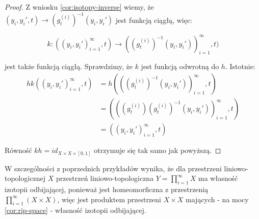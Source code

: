 \begin{ex}
\begin{proof}
    Z wniosku \ref{cor:isotopy-inverse} wiemy, że $(y_i, y_i', t) \rightarrow (g_t^{(i)})^{-1}(y_i, y_i')$ jest funkcją ciągłą, więc:
    
    \[
      k: ((y_i, y_i')_{i=1}^\infty, t) \rightarrow ((g_t^{(i)})^{-1}(y_i, y_i'))_{i=1}^\infty, t)
    \]
    
    jest także funkcją ciągłą. Sprawdzimy, że $k$ jest funkcją odwrotną do $h$. Istotnie:
    \begin{align*}
      hk((y_i, y_i')_{i=1}^\infty, t) &= h(((g_t^{(i)})^{-1}(y_i, y_i'))_{i=1}^\infty, t) \\
      &= (((g_t^{(i)})(g_t^{(i)})^{-1}(y_i, y_i'))_{i=1}^\infty, t) \\
      &= ((y_i, y_i')_{i=1}^\infty, t)
    \end{align*}
    
    Równość $kh = id_{X \times X \times [0,1]}$ otrzymuje się tak samo jak powyższą.

  \end{proof}
\end{ex}

\begin{ex}
  W szczególności z poprzednich przykładów wynika, że dla przestrzeni liniowo-topologicznej $X$ przestrzeń liniowo-topologiczna $Y = \prod_{i=1}^\infty X$ ma własność izotopii odbijającej, ponieważ jest homeomorficzna z przestrzenią $\prod_{i=1}^\infty (X \times X)$, więc jest produktem przestrzeni $X \times X$ mających - na mocy \ref{cor:rip-space} - własność izotopii odbijającej.
\end{ex}


